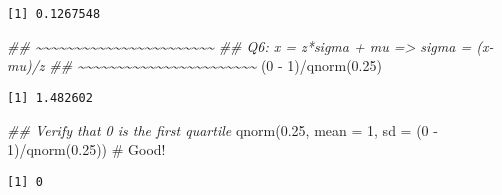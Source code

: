 \documentclass[
  letterpaper,
  DIV=11,
  numbers=noendperiod]{scrreprt}
\newenvironment{Shaded}{\begin{snugshade}}{\end{snugshade}}
\newcommand{\AttributeTok}[1]{\textcolor[rgb]{0.40,0.45,0.13}{#1}}
\newcommand{\CommentTok}[1]{\textcolor[rgb]{0.37,0.37,0.37}{#1}}
\newcommand{\DecValTok}[1]{\textcolor[rgb]{0.68,0.00,0.00}{#1}}
\newcommand{\DocumentationTok}[1]{\textcolor[rgb]{0.37,0.37,0.37}{\textit{#1}}}
\newcommand{\FloatTok}[1]{\textcolor[rgb]{0.68,0.00,0.00}{#1}}
\newcommand{\FunctionTok}[1]{\textcolor[rgb]{0.28,0.35,0.67}{#1}}
\newcommand{\NormalTok}[1]{\textcolor[rgb]{0.00,0.23,0.31}{#1}}
\newcommand{\SpecialCharTok}[1]{\textcolor[rgb]{0.37,0.37,0.37}{#1}}
\begin{document}
\begin{verbatim}
[1] 0.1267548
\end{verbatim}

\begin{Shaded}
\begin{Highlighting}[]
\DocumentationTok{\#\# \textasciitilde{}\textasciitilde{}\textasciitilde{}\textasciitilde{}\textasciitilde{}\textasciitilde{}\textasciitilde{}\textasciitilde{}\textasciitilde{}\textasciitilde{}\textasciitilde{}\textasciitilde{}\textasciitilde{}\textasciitilde{}\textasciitilde{}\textasciitilde{}\textasciitilde{}\textasciitilde{}\textasciitilde{}\textasciitilde{}\textasciitilde{}\textasciitilde{}\textasciitilde{}}
\DocumentationTok{\#\# Q6: x = z*sigma + mu =\textgreater{} sigma = (x{-}mu)/z}
\DocumentationTok{\#\# \textasciitilde{}\textasciitilde{}\textasciitilde{}\textasciitilde{}\textasciitilde{}\textasciitilde{}\textasciitilde{}\textasciitilde{}\textasciitilde{}\textasciitilde{}\textasciitilde{}\textasciitilde{}\textasciitilde{}\textasciitilde{}\textasciitilde{}\textasciitilde{}\textasciitilde{}\textasciitilde{}\textasciitilde{}\textasciitilde{}\textasciitilde{}\textasciitilde{}\textasciitilde{}}
\NormalTok{(}\DecValTok{0} \SpecialCharTok{{-}} \DecValTok{1}\NormalTok{)}\SpecialCharTok{/}\FunctionTok{qnorm}\NormalTok{(}\FloatTok{0.25}\NormalTok{)}
\end{Highlighting}
\end{Shaded}

\begin{verbatim}
[1] 1.482602
\end{verbatim}

\begin{Shaded}
\begin{Highlighting}[]
\DocumentationTok{\#\# Verify that 0 is the first quartile}
\FunctionTok{qnorm}\NormalTok{(}\FloatTok{0.25}\NormalTok{, }\AttributeTok{mean =} \DecValTok{1}\NormalTok{, }\AttributeTok{sd =}\NormalTok{ (}\DecValTok{0} \SpecialCharTok{{-}} \DecValTok{1}\NormalTok{)}\SpecialCharTok{/}\FunctionTok{qnorm}\NormalTok{(}\FloatTok{0.25}\NormalTok{)) }\CommentTok{\# Good!}
\end{Highlighting}
\end{Shaded}

\begin{verbatim}
[1] 0
\end{verbatim}
\end{document}
